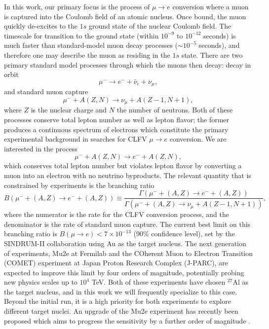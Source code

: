 \documentclass{book}[letterpaper,12pt]
\begin{document}
In this work, our primary focus is the process of $\mu\rightarrow e$ conversion where a muon is captured into the Coulomb field of an atomic nucleus. 
Once bound, the muon quickly de-excites to the $1s$ ground state of the nuclear Coulomb field. The timescale for transition to the ground state (within $10^{-9}$ to $10^{-12}$ seconds) is much faster than standard-model muon decay processes ($\sim 10^{-5}$ seconds), and therefore one may describe the muon as residing in the $1s$ state. There are two primary standard model processes through which the muons then decay: decay in orbit
\begin{equation}
\mu^-\rightarrow e^- + \bar{\nu}_e+\nu_{\mu},
\end{equation}
and standard muon capture
\begin{equation}
\mu^- + A(Z,N)\rightarrow \nu_{\mu}+A(Z-1,N+1),
\end{equation}
where $Z$ is the nuclear charge and $N$ the number of neutrons. Both of these processes conserve total lepton number as well as lepton flavor; the former produces a continuous spectrum of electrons which constitute the primary experimental background in searches for CLFV $\mu\rightarrow e$ conversion. We are interested in the process
\begin{equation}
\mu^-+A(Z,N)\rightarrow e^- + A(Z,N),
\end{equation}
which conserves total lepton number but violates lepton flavor  by converting a muon into an electron with no neutrino byproducts. The relevant quantity that is constrained by experiments is the branching ratio
\begin{equation}
B(\mu^-+(A,Z)\rightarrow e^- + (A,Z))\equiv\frac{\Gamma(\mu^-+(A,Z)\rightarrow e^-+(A,Z))}{\Gamma(\mu^-+(A,Z)\rightarrow\nu_{\mu}+A(Z-1,N+1))},
\end{equation}
where the numerator is the rate for the CLFV conversion process, and the denominator is the rate of standard muon capture. The current best limit on this branching ratio is $B(\mu\rightarrow e)<7\times 10^{-13}$ (90\% confidence level), set by the SINDRUM-II collaboration \citep{Bertl2006} using Au as the target nucleus. The next generation of experiments, Mu2e at Fermilab \citep{Bernstein_2019} and the COherent Muon to Electron Transition (COMET) experiment \citep{10.3389/fphy.2018.00133} at Japan Proton Research Complex (J-PARC), are expected to improve this limit by four orders of magnitude, potentially probing new physics scales up to $10^4$ TeV. Both of these experiments have chosen $^{27}$Al as the target nucleus, and in this work we will frequently specialize to this case. Beyond the initial run, it is a high priority for both experiments to explore different target nuclei. An upgrade of the Mu2e experiment has recently been proposed which aims to progress the sensitivity by a further order of magnitude \cite{Mu2e:2018osu}.
\end{document}
